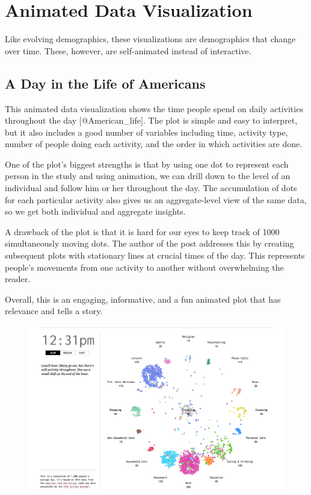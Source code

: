 \documentclass[]{book}
\theoremstyle{definition}
\theoremstyle{definition}
\theoremstyle{definition}
\theoremstyle{remark}
\begin{document}
\section{Animated Data Visualization}\label{animated-data-visualization}

Like evolving demographics, these visualizations are demographics that
change over time. These, however, are self-animated instead of
interactive.

\subsection{A Day in the Life of
Americans}\label{a-day-in-the-life-of-americans}

This animated data visualization shows the time people spend on daily
activities throughout the day {[}@American\_life{]}. The plot is simple
and easy to interpret, but it also includes a good number of variables
including time, activity type, number of people doing each activity, and
the order in which activities are done.

One of the plot's biggest strengths is that by using one dot to
represent each person in the study and using animation, we can drill
down to the level of an individual and follow him or her throughout the
day. The accumulation of dots for each particular activity also gives us
an aggregate-level view of the same data, so we get both individual and
aggregate insights.

A drawback of the plot is that it is hard for our eyes to keep track of
1000 simultaneously moving dots. The author of the post addresses this
by creating subsequent plots with stationary lines at crucial times of
the day. This represents people's movements from one activity to another
without overwhelming the reader.

Overall, this is an engaging, informative, and a fun animated plot that
has relevance and tells a story.

\begin{figure}
\centering
\includegraphics{images/life_of_americans.png}
\caption{}
\end{figure}
\end{document}
